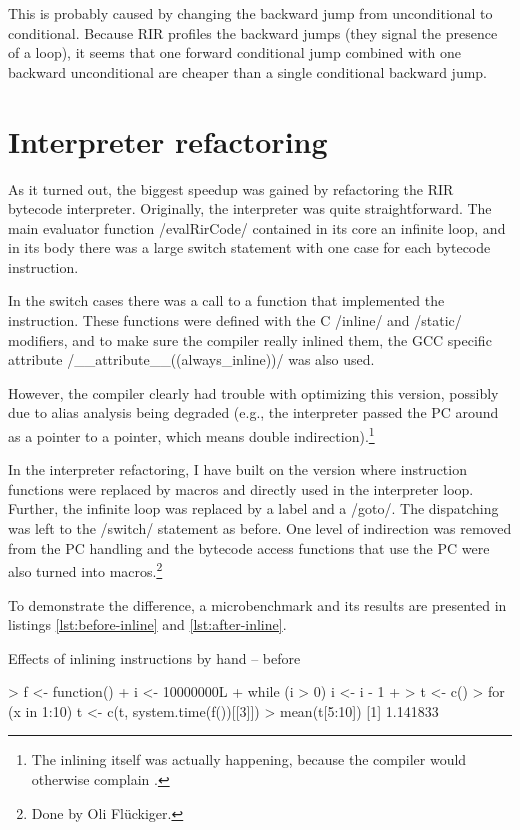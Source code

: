 This is probably caused by changing the backward jump from unconditional to conditional. Because RIR profiles the backward jumps (they signal the presence of a loop), it seems that one forward conditional jump combined with one backward unconditional are cheaper than a single conditional backward jump.


\section{Interpreter refactoring}

As it turned out, the biggest speedup was gained by refactoring the RIR bytecode interpreter. Originally, the interpreter was quite straightforward. The main evaluator function \cinline/evalRirCode/ contained in its core an infinite loop, and in its body there was a large switch statement with one case for each bytecode instruction.

In the switch cases there was a call to a function that implemented the instruction. These functions were defined with the C \cinline/inline/ and \cinline/static/ modifiers, and to make sure the compiler really inlined them, the GCC specific attribute \cinline/__attribute__((always_inline))/ was also used.

However, the compiler clearly had trouble with optimizing this version, possibly due to alias analysis being degraded (e.g., the interpreter passed the PC around as a pointer to a pointer, which means double indirection).\footnote{The inlining itself was actually happening, because the compiler would otherwise complain \autocite{gcc-inline}.}

In the interpreter refactoring, I have built on the version where instruction functions were replaced by macros and directly used in the interpreter loop. Further, the infinite loop was replaced by a label and a \cinline/goto/. The dispatching was left to the \cinline/switch/ statement as before. One level of indirection was removed from the PC handling and the bytecode access functions that use the PC were also turned into macros.\footnote{Done by Oli Flückiger.}

To demonstrate the difference, a microbenchmark and its results are presented in listings \ref{lst:before-inline} and \ref{lst:after-inline}.

\begin{listing}[htbp]
  \caption{\label{lst:before-inline}Effects of inlining instructions by hand -- before}
  \begin{rcode}
> f <- function() {
+     i <- 10000000L
+     while (i > 0) i <- i - 1
+ }
> t <- c()
> for (x in 1:10) t <- c(t, system.time(f())[[3]])
> mean(t[5:10])
[1] 1.141833
  \end{rcode}
\end{listing}

